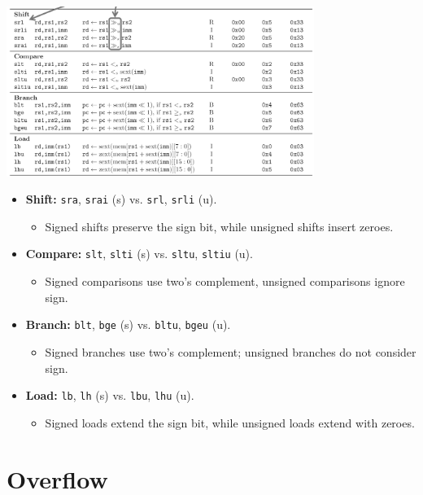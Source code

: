 \begin{center}
    \includegraphics[width=0.75\textwidth]{chapters/chapter1e/images/ref_card.png}
\end{center}
\begin{itemize}
    \item \textbf{Shift:} \texttt{sra}, \texttt{srai} (s) vs. \texttt{srl}, \texttt{srli} (u). 
    \begin{itemize}
        \item Signed shifts preserve the sign bit, while unsigned shifts insert zeroes.
    \end{itemize}
    
    \item \textbf{Compare:} \texttt{slt}, \texttt{slti} (s) vs. \texttt{sltu}, \texttt{sltiu} (u). 
    \begin{itemize}
        \item Signed comparisons use two's complement, unsigned comparisons ignore sign.
    \end{itemize}
    
    \item \textbf{Branch:} \texttt{blt}, \texttt{bge} (s) vs. \texttt{bltu}, \texttt{bgeu} (u). 
    \begin{itemize}
        \item Signed branches use two's complement; unsigned branches do not consider sign.
    \end{itemize}
    
    \item \textbf{Load:} \texttt{lb}, \texttt{lh} (s) vs. \texttt{lbu}, \texttt{lhu} (u). 
    \begin{itemize}
        \item Signed loads extend the sign bit, while unsigned loads extend with zeroes.
    \end{itemize}
\end{itemize}


\section{Overflow}


